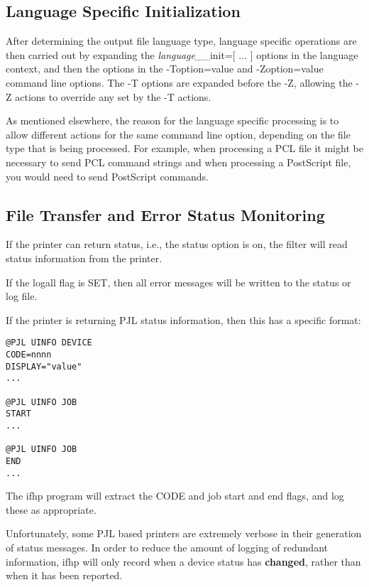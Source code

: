 \documentclass[a4paper]{article}
\begin{document}
\subsection{Language Specific Initialization
\label{languageinit}}

After determining the output file language type,
language specific operations are then carried out by
expanding the
{\itshape language\_\/}{\ttfamily \_init={[} ... {]}}
options in the language context,
and then the options in the
{\ttfamily -Toption=value}
and
{\ttfamily -Zoption=value}
command line options.
The 
{\ttfamily -T}
options are expanded before the
{\ttfamily -Z},
allowing the 
{\ttfamily -Z} actions to override any set by the
{\ttfamily -T} actions.

As mentioned elsewhere,
the reason for the language specific processing is to allow
different actions for the same command line option,
depending on the file type that is being processed.
For example,  when processing a PCL file it might be necessary to send
PCL command strings and when processing a PostScript file,
you would need to send PostScript commands.


\subsection{File Transfer and Error Status Monitoring
\label{filetransfer}
\label{logall}
\label{pjl_error_codes}
\label{pjl_quiet_codes}}

If the printer can return status, i.e., the
{\ttfamily status} option is on,
the filter will read status information from the printer.

If the
{\ttfamily logall}
flag is SET,
then all error messages will be written to the status or log file.

If the printer is returning PJL status information,
then this has a specific format:
\begin{tscreen}
\begin{verbatim}
@PJL UINFO DEVICE
CODE=nnnn
DISPLAY="value"
...

@PJL UINFO JOB
START
...

@PJL UINFO JOB
END
...
\end{verbatim}
\end{tscreen}


The
{\ttfamily ifhp} program will extract the
{\ttfamily CODE}
and job start and end flags,
and log these as appropriate.

Unfortunately,
some PJL based printers are extremely verbose in their generation of status
messages.
In order to reduce the amount of logging of redundant information,
{\ttfamily ifhp}
will only record when a device status has
{\bfseries changed},
rather than when it has been reported.
\end{document}
